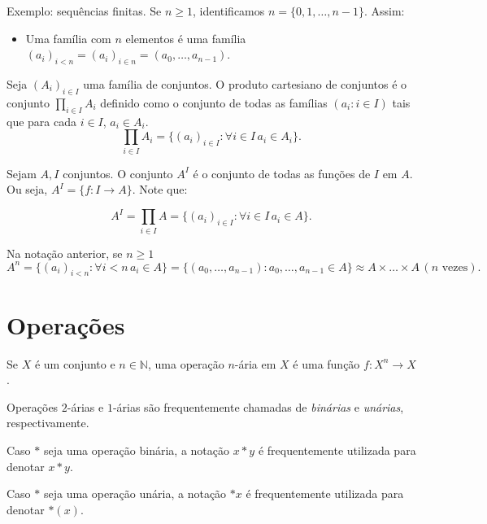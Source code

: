 Exemplo: sequências finitas. Se $n\geq 1$, identificamos $n=\{0, 1, \dots, n-1\}$. Assim:
\begin{itemize}
\item Uma família com $n$ elementos é uma família $(a_i)_{i<n}=(a_i)_{i \in n}=(a_0, \dots, a_{n-1})$.
\end{itemize}

\begin{definition}
Seja $(A_i)_{i \in I}$ uma família de conjuntos. O produto cartesiano de conjuntos é o conjunto $\prod_{i \in I} A_i$ definido como o conjunto de todas as famílias $(a_i: i \in I)$ tais que para cada $i \in I$, $a_i \in A_i$.
$$\prod_{i \in I} A_i=\{(a_i)_{i \in I}: \forall i \in I\, a_i \in A_i\}.$$
\end{definition}


\begin{definition}
    Sejam $A, I$ conjuntos. O conjunto $A^I$ é o conjunto de todas as funções de $I$ em $A$. Ou seja, $A^I=\{f:I\rightarrow A\}$. Note que:

    $$A^I=\prod_{i \in I}A=\{(a_i)_{i \in I}: \forall i \in I\,  a_i\in A\}.$$
    \end{definition}

    Na notação anterior, se $n\geq 1$ $$A^n=\{(a_i)_{i<n}:\forall i<n\, a_i \in A\}=\{(a_0, \dots, a_{n-1}):a_0, \dots, a_{n-1}\in A\}\approx A\times \dots \times A \,(n \text{ vezes}).$$

    \section{Operações}

\begin{definition}
    Se $X$ é um conjunto e $n \in \mathbb N$, uma operação $n$-ária em $X$ é uma função $f:X^n\rightarrow X$.
\end{definition}

Operações $2$-árias e $1$-árias são frequentemente chamadas de \emph{binárias} e \emph{unárias}, respectivamente.

Caso $*$ seja uma operação binária, a notação $x*y$ é frequentemente utilizada para denotar $x*y$.

Caso $*$ seja uma operação unária, a notação $*x$ é frequentemente utilizada para denotar $*(x)$.

